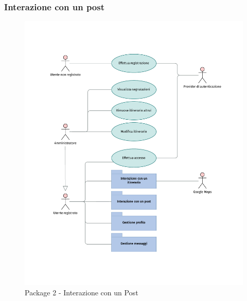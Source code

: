 \documentclass{natourDoc}
\begin{document}
	\subsubsection{Interazione con un post}
	\begin{figure}[!htbp]
		\centering
		\includegraphics[width=\textwidth, page=4]{./diagrams/useCase.pdf}
		\caption{Package 2 - Interazione con un Post}
	\end{figure}
	\FloatBarrier

	\newpage
\end{document}

